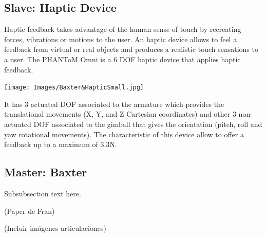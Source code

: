 \documentclass[journal,twoside]{JoPhA}
\begin{document}
\subsection{Slave: Haptic Device}
Haptic feedback takes advantage of the human sense of touch by recreating forces, vibrations or motions to the user. 
An haptic device allows to feel a feedback from virtual or real objects and produces a realistic touch sensations to a user. 
The PHANToM Omni is a 6 DOF haptic device that applies haptic feedback. 

\texttt{[image: Images/Baxter\&HapticSmall.jpg]} 

It has 3 actuated DOF associated to the armature which provides the translational movements (X, Y, and Z Cartesian coordinates) and other 3 non-actuated DOF associated to the gimball  that gives the orientation (pitch, roll and yaw rotational movements).  The characteristic of this device allow to offer a feedback up to a maximum of 3.3N.


\subsection{Master: Baxter}
Subsubsection text here. 

(Paper de Fran)

(Incluir imágenes articulaciones)
\end{document}
